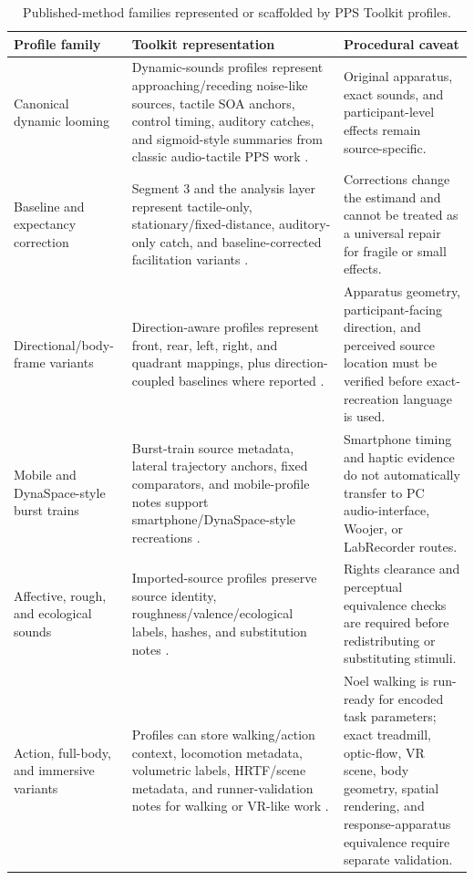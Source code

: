 \documentclass[pdflatex,sn-apa]{sn-jnl}
\begin{document}
\begin{table}[t]
\caption{Published-method families represented or scaffolded by PPS Toolkit profiles.}
\label{tab:profile-families}
\footnotesize
\begin{tabularx}{\textwidth}{>{\raggedright\arraybackslash}p{} >{\raggedright\arraybackslash}X >{\raggedright\arraybackslash}p{}}
\toprule
Profile family & Toolkit representation & Procedural caveat \\
\midrule
Canonical dynamic looming & Dynamic-sounds profiles represent approaching/receding noise-like sources, tactile SOA anchors, control timing, auditory catches, and sigmoid-style summaries from classic audio-tactile PPS work \citep{Canzoneri2012,Farne2002}. & Original apparatus, exact sounds, and participant-level effects remain source-specific. \\
Baseline and expectancy correction & Segment 3 and the analysis layer represent tactile-only, stationary/fixed-distance, auditory-only catch, and baseline-corrected facilitation variants \citep{Hobeika2019,Holmes2020}. & Corrections change the estimand and cannot be treated as a universal repair for fragile or small effects. \\
Directional/body-frame variants & Direction-aware profiles represent front, rear, left, right, and quadrant mappings, plus direction-coupled baselines where reported \citep{Matsuda2021,Teraoka2024,Amiel2025}. & Apparatus geometry, participant-facing direction, and perceived source location must be verified before exact-recreation language is used. \\
Mobile and DynaSpace-style burst trains & Burst-train source metadata, lateral trajectory anchors, fixed comparators, and mobile-profile notes support smartphone/DynaSpace-style recreations \citep{Roussel2025,Hobeika2019}. & Smartphone timing and haptic evidence do not automatically transfer to PC audio-interface, Woojer, or LabRecorder routes. \\
Affective, rough, and ecological sounds & Imported-source profiles preserve source identity, roughness/valence/ecological labels, hashes, and substitution notes \citep{Taffou2021,Ferri2015,Bahadori2021}. & Rights clearance and perceptual equivalence checks are required before redistributing or substituting stimuli. \\
Action, full-body, and immersive variants & Profiles can store walking/action context, locomotion metadata, volumetric labels, HRTF/scene metadata, and runner-validation notes for walking or VR-like work \citep{Noel2015,Lerner2021}. & Noel walking is run-ready for encoded task parameters; exact treadmill, optic-flow, VR scene, body geometry, spatial rendering, and response-apparatus equivalence require separate validation. \\
\bottomrule
\end{tabularx}
\end{table}
\end{document}
